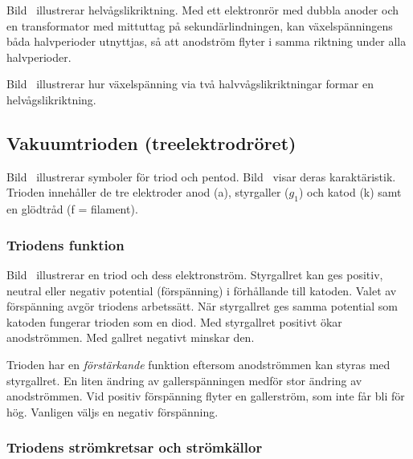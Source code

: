 Bild~ illustrerar helvågslikriktning.
Med ett elektronrör med dubbla anoder och en transformator med mittuttag på
sekundärlindningen, kan växelspänningens båda halvperioder utnyttjas, så att
anodström flyter i samma riktning under alla halvperioder.

Bild~ illustrerar hur växelspänning via två
halvvågslikriktningar formar en helvågslikriktning.

\subsection{Vakuumtrioden (treelektrodröret)}

Bild~ illustrerar symboler för triod och pentod.
Bild~ visar deras karaktäristik.
Trioden innehåller de tre elektroder anod (a), styrgaller (\(g_1\)) och katod
(k) samt en glödtråd (f = filament).

\newpage
{}



\subsubsection{Triodens funktion}

Bild~ illustrerar en triod och dess elektronström.
Styrgallret kan ges positiv, neutral eller negativ potential (förspänning) i
förhållande till katoden.
Valet av förspänning avgör triodens arbetssätt.
När styrgallret ges samma potential som katoden fungerar trioden som en diod.
Med styrgallret positivt ökar anodströmmen.
Med gallret negativt minskar den.

Trioden har en \emph{förstärkande} funktion eftersom anodströmmen kan styras med
styrgallret.
En liten ändring av gallerspänningen medför stor ändring av anodströmmen.
Vid positiv förspänning flyter en gallerström, som inte får bli för hög.
Vanligen väljs en negativ förspänning.

\subsubsection{Triodens strömkretsar och strömkällor}

